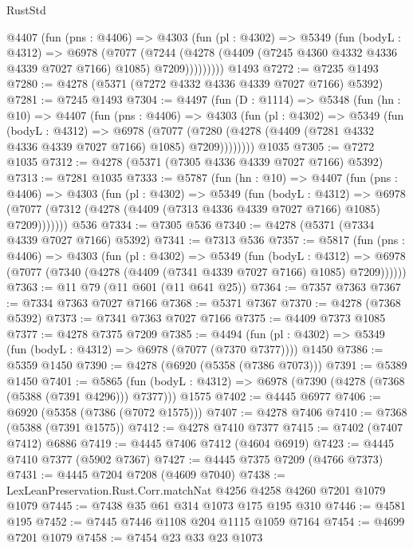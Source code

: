 \begin{lexlean}{RustStd}
\begin{coremodule}
{\begin{coremodule}
{{{{{{{{{{{{{{{{{{{{{{{{{{{{{{{{{{{        @4407
          (fun (pns : @4406) =>
          @4303
            (fun (pl : @4302) =>
            @5349
              (fun (bodyL : @4312) =>
              @6978
                (@7077
                  (@7244
                    (@4278 (@4409 (@7245 @4360 @4332 @4336 @4339 @7027 @7166) @1085) @7209)))))))))
    @1493
@7272 := @7235 @1493
@7280 := @4278 (@5371 (@7272 @4332 @4336 @4339 @7027 @7166) @5392)
@7281 := @7245 @1493
@7304 := @4497
    (fun (D : @1114) =>
    @5348
      (fun (hn : @10) =>
      @4407
        (fun (pns : @4406) =>
        @4303
          (fun (pl : @4302) =>
          @5349
            (fun (bodyL : @4312) =>
            @6978
              (@7077 (@7280 (@4278 (@4409 (@7281 @4332 @4336 @4339 @7027 @7166) @1085) @7209))))))))
    @1035
@7305 := @7272 @1035
@7312 := @4278 (@5371 (@7305 @4336 @4339 @7027 @7166) @5392)
@7313 := @7281 @1035
@7333 := @5787
    (fun (hn : @10) =>
    @4407
      (fun (pns : @4406) =>
      @4303
        (fun (pl : @4302) =>
        @5349
          (fun (bodyL : @4312) =>
          @6978 (@7077 (@7312 (@4278 (@4409 (@7313 @4336 @4339 @7027 @7166) @1085) @7209)))))))
    @536
@7334 := @7305 @536
@7340 := @4278 (@5371 (@7334 @4339 @7027 @7166) @5392)
@7341 := @7313 @536
@7357 := @5817
    (fun (pns : @4406) =>
    @4303
      (fun (pl : @4302) =>
      @5349
        (fun (bodyL : @4312) =>
        @6978 (@7077 (@7340 (@4278 (@4409 (@7341 @4339 @7027 @7166) @1085) @7209))))))
@7363 := @11 @79 (@11 @601 (@11 @641 @25))
@7364 := @7357 @7363
@7367 := @7334 @7363 @7027 @7166
@7368 := @5371 @7367
@7370 := @4278 (@7368 @5392)
@7373 := @7341 @7363 @7027 @7166
@7375 := @4409 @7373 @1085
@7377 := @4278 @7375 @7209
@7385 := @4494
    (fun (pl : @4302) => @5349 (fun (bodyL : @4312) => @6978 (@7077 (@7370 @7377))))
    @1450
@7386 := @5359 @1450
@7390 := @4278 (@6920 (@5358 (@7386 @7073)))
@7391 := @5389 @1450
@7401 := @5865
    (fun (bodyL : @4312) => @6978 (@7390 (@4278 (@7368 (@5388 (@7391 @4296))) @7377)))
    @1575
@7402 := @4445 @6977
@7406 := @6920 (@5358 (@7386 (@7072 @1575)))
@7407 := @4278 @7406
@7410 := @7368 (@5388 (@7391 @1575))
@7412 := @4278 @7410 @7377
@7415 := @7402 (@7407 @7412) @6886
@7419 := @4445 @7406 @7412 (@4604 @6919)
@7423 := @4445 @7410 @7377 (@5902 @7367)
@7427 := @4445 @7375 @7209 (@4766 @7373)
@7431 := @4445 @7204 @7208 (@4609 @7040)
@7438 := LexLeanPreservation.Rust.Corr.matchNat @4256 @4258 @4260 @7201 @1079 @1079
@7445 := @7438 @35 @61 @314 @1073 @175 @195 @310
@7446 := @4581 @195
@7452 := @7445 @7446 @1108 @204 @1115 @1059 @7164
@7454 := @4699 @7201 @1079
@7458 := @7454 @23 @33 @23 @1073
}}}}}}}}}}}}}}}}}}}}}}}}}}}}}}}}}}}
\end{coremodule}}
\end{coremodule}
\end{lexlean}
